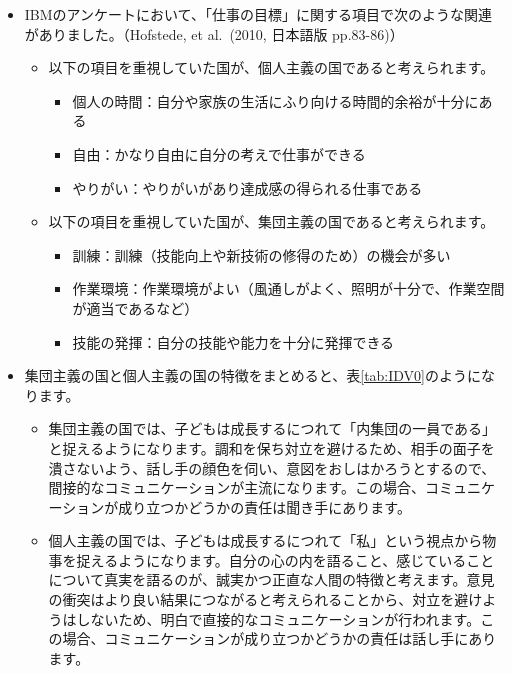 \documentclass[
]{book}
\begin{document}
\begin{itemize}
\item
  IBMのアンケートにおいて、「仕事の目標」に関する項目で次のような関連がありました。（Hofstede, et al.~(2010, 日本語版 pp.83-86)）

  \begin{itemize}
  \item
    以下の項目を重視していた国が、個人主義の国であると考えられます。

    \begin{itemize}
    \item
      個人の時間：自分や家族の生活にふり向ける時間的余裕が十分にある
    \item
      自由：かなり自由に自分の考えで仕事ができる
    \item
      やりがい：やりがいがあり達成感の得られる仕事である
    \end{itemize}
  \item
    以下の項目を重視していた国が、集団主義の国であると考えられます。

    \begin{itemize}
    \item
      訓練：訓練（技能向上や新技術の修得のため）の機会が多い
    \item
      作業環境：作業環境がよい（風通しがよく、照明が十分で、作業空間が適当であるなど）
    \item
      技能の発揮：自分の技能や能力を十分に発揮できる
    \end{itemize}
  \end{itemize}
\item
  集団主義の国と個人主義の国の特徴をまとめると、表\ref{tab:IDV0}のようになります。

  \begin{itemize}
  \item
    集団主義の国では、子どもは成長するにつれて「内集団の一員である」と捉えるようになります。調和を保ち対立を避けるため、相手の面子を潰さないよう、話し手の顔色を伺い、意図をおしはかろうとするので、間接的なコミュニケーションが主流になります。この場合、コミュニケーションが成り立つかどうかの責任は聞き手にあります。
  \item
    個人主義の国では、子どもは成長するにつれて「私」という視点から物事を捉えるようになります。自分の心の内を語ること、感じていることについて真実を語るのが、誠実かつ正直な人間の特徴と考えます。意見の衝突はより良い結果につながると考えられることから、対立を避けようはしないため、明白で直接的なコミュニケーションが行われます。この場合、コミュニケーションが成り立つかどうかの責任は話し手にあります。
  \end{itemize}
\end{itemize}
\end{document}
